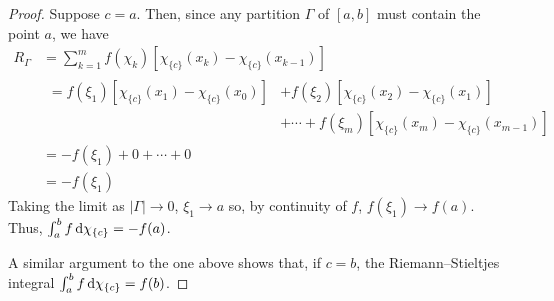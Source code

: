 \begin{proof}
Suppose $c=a$. Then, since any partition $\Gamma$ of $[a,b]$ must contain
the point $a$, we have
\begin{equation}
\label{eq:prep:1:18}
\begin{aligned}
R_\Gamma
&=\sum_{k=1}^mf(\chi_k)[\chi_{\{c\}}(x_k)-\chi_{\{c\}}(x_{k-1})]\\
&
\begin{aligned}
=f(\xi_1)[\chi_{\{c\}}(x_1)-\chi_{\{c\}}(x_0)]&
+f(\xi_2)[\chi_{\{c\}}(x_2)-\chi_{\{c\}}(x_1)]\\
&+\dotsb+f(\xi_m)[\chi_{\{c\}}(x_m)-\chi_{\{c\}}(x_{m-1})]
\end{aligned}\\
&=-f(\xi_1)+0+\dotsb+0\\
&=-f(\xi_1)
\end{aligned}
\end{equation}
Taking the limit as $|\Gamma|\to 0$, $\xi_1\to a$ so, by continuity of $f$,
$f(\xi_1)\to f(a)$. Thus, $\int_a^b f\mathop{}\!\mathrm{d}\chi_{\{c\}}=-f(a)$.

A similar argument to the one above shows that, if $c=b$, the
Riemann--Stieltjes integral $\int_a^bf\mathop{}\!\mathrm{d}\chi_{\{c\}}=f(b)$.
\end{proof}

